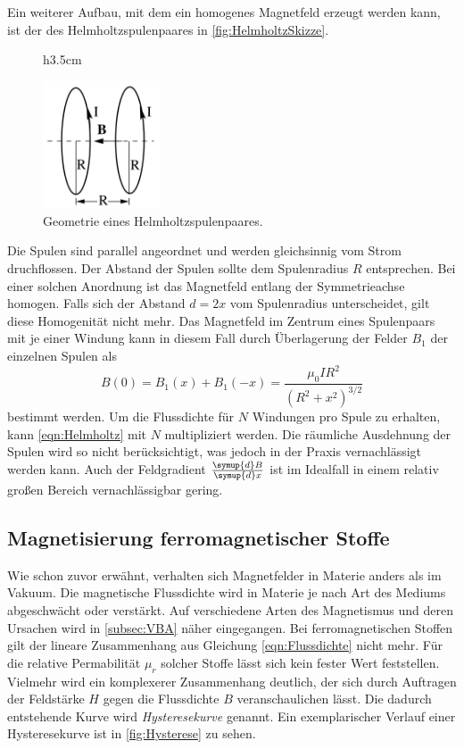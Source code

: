 Ein weiterer Aufbau, mit dem ein homogenes Magnetfeld erzeugt werden kann, ist der des Helmholtzspulenpaares in \autoref{fig:HelmholtzSkizze}.
\begin{figure}{h}{3.5cm}
    \centering
    \caption{Geometrie eines Helmholtzspulenpaares. \cite{v308}}
    \label{fig:HelmholtzSkizze}
    \includegraphics[width=3.5cm]{content/HelmholtzSkizze.jpg}
\end{figure}
Die Spulen sind parallel angeordnet und werden gleichsinnig vom Strom druchflossen. Der Abstand der Spulen sollte dem Spulenradius $R$ entsprechen. Bei einer solchen Anordnung 
ist das Magnetfeld entlang der Symmetrieachse homogen. Falls sich der Abstand $d = 2x$ vom Spulenradius unterscheidet, gilt diese Homogenität nicht mehr. Das Magnetfeld im 
Zentrum eines Spulenpaars mit je einer Windung kann in diesem Fall durch Überlagerung der Felder $B_1$ der einzelnen Spulen als
\begin{equation}
    \label{eqn:Helmholtz}
    B(0) = B_1(x) + B_1(-x) = \frac{\mu_0 I R^2}{(R^2 + x^2)^{3/2}}
\end{equation}
bestimmt werden. Um die Flussdichte für $N$ Windungen pro Spule zu erhalten, kann \autoref{eqn:Helmholtz} mit $N$ multipliziert werden. Die räumliche Ausdehnung
der Spulen wird so nicht berücksichtigt, was jedoch in der Praxis vernachlässigt werden kann.
Auch der Feldgradient $\frac{\symup{d}B}{\symup{d}x}$ ist im Idealfall in einem relativ großen Bereich vernachlässigbar gering.

\subsection{Magnetisierung ferromagnetischer Stoffe}
\label{subsec:Hysterese}
Wie schon zuvor erwähnt, verhalten sich Magnetfelder in Materie anders als im Vakuum. Die magnetische Flussdichte wird in Materie je nach Art des Mediums
abgeschwächt oder verstärkt. Auf verschiedene Arten des Magnetismus und deren Ursachen wird in \autoref{subsec:VBA} näher eingegangen. Bei ferromagnetischen Stoffen gilt der lineare 
Zusammenhang aus Gleichung \eqref{eqn:Flussdichte} nicht mehr. Für die relative Permabilität $\mu_r$ solcher Stoffe lässt sich kein fester Wert feststellen. Vielmehr wird ein 
komplexerer Zusammenhang deutlich, der sich durch Auftragen der Feldstärke $H$ gegen die Flussdichte $B$ veranschaulichen lässt. Die dadurch entstehende Kurve wird 
\textit{Hysteresekurve} genannt. Ein exemplarischer Verlauf einer Hysteresekurve ist in \autoref{fig:Hysterese} zu sehen.

